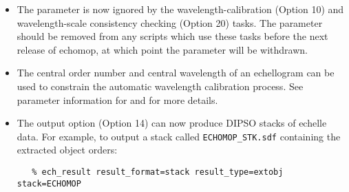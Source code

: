 \begin{itemize}
\item The parameter  is
   now ignored by the wavelength-calibration
   (Option 10) and wavelength-scale consistency checking (Option 20)
   tasks.  The parameter should be removed from any scripts which use
   these tasks before the next release of {\sc echomop,} at which point the
   parameter will be withdrawn.
\item The central order number and central wavelength of an
   echellogram can be used to constrain the automatic wavelength
   calibration process.  See parameter information for
   and  for more details.
\item The output option (Option 14) can now produce DIPSO stacks of
   echelle data.  For example, to output a stack called
   \verb+ECHOMOP_STK.sdf+ containing the extracted object orders:

\begin{verbatim}
   % ech_result result_format=stack result_type=extobj stack=ECHOMOP
\end{verbatim}


\end{itemize}

